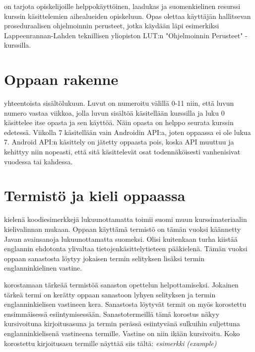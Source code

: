 \documentclass[a4paper,justified,notoc]{tufte-book}
\newcommand{\lutin}{Lappeenrannan-Lahden teknillisen yliopiston LUT:n }
\newcommand{\eng}[1]{\textit{(#1)}}
\newcommand{\newnogls}[1]{\textit{#1}}
\newcommand{\newengnogls}[2]{\newnogls{#1} \eng{#2}}
\begin{document}
\begin{fullwidth}
 on tarjota opiskelijoille helppokäyttöinen,
laadukas ja suomenkielinen resurssi kurssin käsittelemien aihealueiden
opiskeluun. Opas olettaa käyttäjän hallitsevan proseduraalisen ohjelmoinnin
perusteet, jotka käydään läpi esimerkiksi \lutin "Ohjelmoinnin Perusteet" 
-kurssilla.


\section{Oppaan rakenne}
\label{rakenteesta}

 yhteentoista sisältölukuun. Luvut on numeroitu välillä 0-11 niin, että
luvun numero vastaa viikkoa, jolla luvun sisältöä käsitellään kurssilla ja luku 0 käsittelee itse
opasta ja sen käyttöä. Näin opasta on helppo seurata kurssin edetessä. Viikolla 7 käsitellään vain
Androidin API:a, joten oppaassa ei ole lukua 7. Android API:n käsittely on jätetty oppaasta pois,
koska API muuttuu ja kehittyy niin nopeasti, että sitä käsittelevät osat todennäköisesti
vanhenisivat vuodessa tai kahdessa.


\section{Termistö ja kieli oppaassa}
\label{kielestä}

 kielenä koodiesimerkkejä lukuunottamatta toimii suomi muun
kurssimateriaalin kielivalinnan mukaan. Oppaan käyttämä termistö on tämän vuoksi käännetty Javan
avainsanoja lukuunottamatta suomeksi. Olisi kuitenkaan turha kiistää englannin ehdotonta ylivaltaa
tietojenkäsittelytieteen pääkielenä. Tämän vuoksi oppaan sanastosta löytyy jokaisen termin
selityksen lisäksi termin englanninkielinen vastine.

 korostamaan tärkeää termistöä sanaston opettelun helpottamiseksi.
Jokainen tärkeä termi on kerätty oppaan sanastoon lyhyen selityksen ja termin englanninkielisen
vastineen kera. Sanastosta löytyvät termit on myös korostettu ensimmäisessä esiintymisessään.
Sanastotermeillä tämä korostus näkyy kursivoituna kirjoitusasuna ja termin perässä esiintyvänä
sulkuihin suljettuna englanninkielisenä vastineena termille. Vastine on niin ikään kursivoitu.
Koko korostettu kirjoitusasu termille näyttää siis tältä: \newengnogls{esimerkki}{example}


\end{fullwidth}
\end{document}
